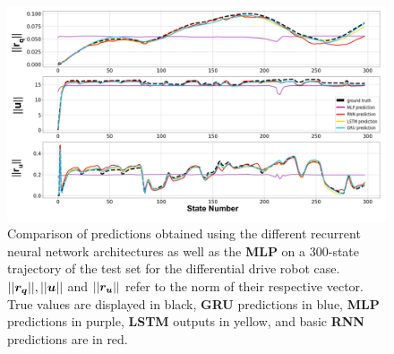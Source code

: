 \begin{figure}[htp]
    \centering
    \includegraphics[width=0.99\linewidth]{figures/learning_unic/all_models_labeled.jpg} 
    \caption{Comparison of predictions obtained using the different recurrent neural network architectures as well as the \textbf{MLP} on a 300-state trajectory of the test set for the differential drive robot case. 
    $||\boldsymbol{r_q}||, ||\boldsymbol{u}||$ and $||\boldsymbol{r_u}||$ refer to the norm of their respective vector. 
    True values are displayed in black, \textbf{GRU} predictions in blue, \textbf{MLP} predictions in purple, \textbf{LSTM} outputs in yellow, and basic \textbf{RNN} predictions are in red.}
    \label{fig:all_models_pred_val_unic}
\end{figure}

